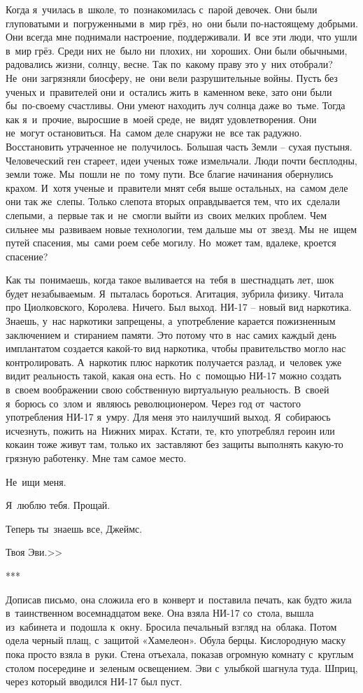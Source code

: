 {Когда я~училась в~школе, то~познакомилась с~парой девочек.
Они были глуповатыми и~погруженными в~мир грёз, но~они были по-настоящему добрыми.
Они всегда мне поднимали настроение, поддерживали.
И~все эти люди, что ушли в~мир грёз.
Среди них не~было ни~плохих, ни~хороших.
Они были обычными, радовались жизни, солнцу, весне.
Так по~какому праву это у~них отобрали? Не~они загрязняли биосферу, не~они вели разрушительные войны.
Пусть без ученых и~правителей они и~остались жить в~каменном веке, зато они были бы~по-своему счастливы.
Они умеют находить луч солнца даже во~тьме.
Тогда как я~и~прочие, выросшие в~моей среде, не~видят удовлетворения.
Они не~могут остановиться.
На~самом деле снаружи не~все так радужно.
Восстановить утраченное не~получилось.
Большая часть Земли -- сухая пустыня.
Человеческий ген стареет, идеи ученых тоже измельчали.
Люди почти бесплодны, земли тоже.
Мы~пошли не~по~тому пути.
Все благие начинания обернулись крахом.
И~хотя ученые и~правители мнят себя выше остальных, на~самом деле они так же~слепы.
Только слепота вторых оправдывается тем, что их~сделали слепыми, а~первые так и~не~смогли выйти из~своих мелких проблем.
Чем сильнее мы~развиваем новые технологии, тем дальше мы~от~звезд.
Мы~не~ищем путей спасения, мы~сами роем себе могилу.
Но~может там, вдалеке, кроется спасение?

Как ты~понимаешь, когда такое выливается на~тебя в~шестнадцать лет, шок будет незабываемым.
Я~пыталась бороться.
Агитация, зубрила физику.
Читала про Циолковского, Королева.
Ничего.
Был выход.
НИ-17 -- новый вид наркотика.
Знаешь, у~нас наркотики запрещены, а~употребление карается пожизненным заключением и~стиранием памяти.
Это потому что в~нас самих каждый день имплантатом создается какой-то вид наркотика, чтобы правительство могло нас контролировать.
А~наркотик плюс наркотик получается разлад, и~человек уже видит реальность такой, какая она есть.
Но~с~помощью НИ-17 можно создать в~своем воображении свою собственную виртуальную реальность.
В~своей я~борюсь со~злом и~являюсь революционером.
Через год от~частого употребления НИ-17 я~умру.
Для меня это наилучший выход.
Я~собираюсь исчезнуть, пожить на~Нижних мирах.
Кстати, те, кто употреблял героин или кокаин тоже живут там, только их~заставляют без защиты выполнять какую-то грязную работенку.
Мне там самое место.

Не~ищи меня.

Я~люблю тебя. Прощай.

Теперь ты~знаешь все, Джеймс.

\begin{flushright}
Твоя Эви.>>
\end{flushright}
}
\begin{center}
	***
\end{center}
 
Дописав письмо, она сложила его в~конверт и~поставила печать, как будто жила в~таинственном восемнадцатом веке.
Она взяла НИ-17 со~стола, вышла из~кабинета и~подошла к~окну.
Бросила печальный взгляд на~облака.
Потом одела черный плащ, с~защитой «Хамелеон».
Обула берцы.
Кислородную маску пока просто взяла в~руки.
Стена отъехала, показав огромную комнату с~круглым столом посередине и~зеленым освещением.
Эви с~улыбкой шагнула туда.
Шприц, через который вводился НИ-17 был пуст.

